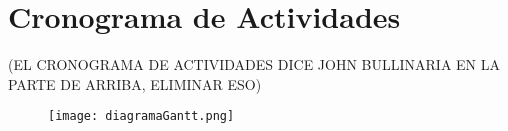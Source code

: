\section{Cronograma de Actividades}
(EL CRONOGRAMA DE ACTIVIDADES DICE JOHN BULLINARIA EN LA PARTE DE ARRIBA, ELIMINAR ESO)

    \begin{figure}[H]
        \centering
        \texttt{[image: diagramaGantt.png]}
        \label{fig:fig8}
    \end{figure}